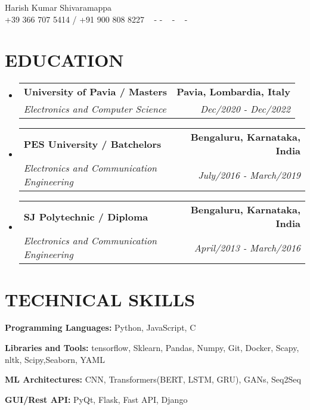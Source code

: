\documentclass[letterpaper,11pt]{article}
\makeatletter
\newcommand{\resumeSubheading}[4]{
  \vspace{-2pt}\item
    \begin{tabular*}{1.0\textwidth}[t]{l@{\extracolsep{\fill}}r}
      \textbf{\large#1} & \textbf{\small #2} \\
      \textit{\large#3} & \textit{\small #4} \\
      
    \end{tabular*}\vspace{-7pt}
}
\newcommand{\resumeSubHeadingListStart}{\begin{itemize}[leftmargin=0.0in, label={}]}
\newcommand{\resumeSubHeadingListEnd}{\end{itemize}}
\makeatother
\begin{document}


\begin{center}
    {\huge Harish Kumar Shivaramappa } \\ \vspace{2pt} 
    {+39 366 707 5414 / +91 900 808 8227} ~ 
    \small{-}
    \small{-}
    \href{mailto:[harishkumarsedu@gmail.com]}{\color{blue}{harishkumarsedu@gmail.com}} ~ 
    \small{-}
    \href{[https://www.linkedin.com/in/harish-kumar-shivaramappa-183292206/]}{ \color{blue}{linkedin}}  ~
    \small{-}
    \href{[github.com/HarishKumarSedu]}{ \color{blue}{github}} ~
    \vspace{-7pt}
\end{center}

\section{\color{airforceblue}EDUCATION}
  \resumeSubHeadingListStart
    \resumeSubheading
      {University of Pavia / Masters}{Pavia, Lombardia, Italy}
      {Electronics and Computer Science }{Dec/2020 - Dec/2022}
    \vspace{-4pt}
     \resumeSubheading
      {PES University / Batchelors}{Bengaluru, Karnataka, India}
      {Electronics and Communication Engineering}{July/2016 - March/2019}
      \vspace{-4pt}
      \resumeSubheading
       {SJ Polytechnic / Diploma}{Bengaluru, Karnataka, India}
       {Electronics and Communication Engineering}{April/2013 - March/2016}
  \resumeSubHeadingListEnd
  \vspace{-10pt}

\section{\color{airforceblue}TECHNICAL SKILLS}
 \begin{itemize}[leftmargin=0in, label={}]
    \small{\item{
     \textbf{\normalsize{Programming Languages:}}{ \normalsize{Python, JavaScript, C}} \\
      \vspace{1.2pt}
      
     \textbf{\normalsize{Libraries and Tools:}}{ \normalsize{tensorflow,  Sklearn, Pandas, Numpy, Git, Docker, Scapy, nltk, Scipy,Seaborn, YAML}} \\
      \vspace{1.2pt}
      
     \textbf{\normalsize{ML Architectures:}}{ \normalsize{CNN, Transformers(BERT, LSTM, GRU), GANs, Seq2Seq }}
      
     \textbf{\normalsize{GUI/Rest API:}}{ \normalsize{ PyQt, Flask, Fast API, Django }}

     }}
 \end{itemize}
 \vspace{-16pt}
 
\end{document}
